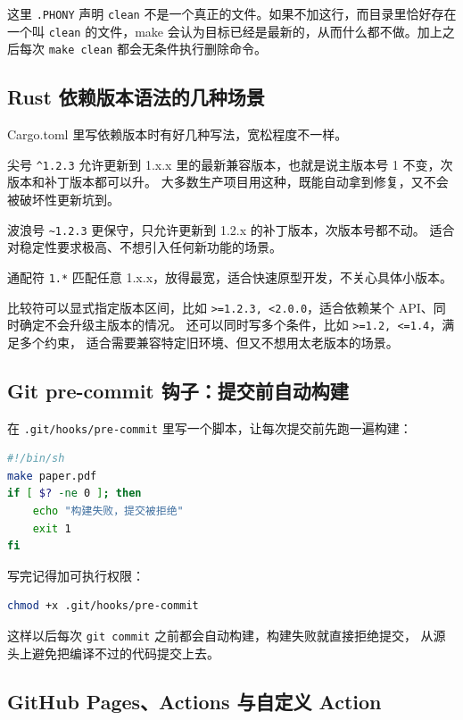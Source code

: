 \documentclass[a4paper,11pt]{ctexart}
\begin{document}
这里 \texttt{.PHONY} 声明 \texttt{clean} 不是一个真正的文件。如果不加这行，而目录里恰好存在一个叫
\texttt{clean} 的文件，make 会认为目标已经是最新的，从而什么都不做。加上之后每次 \texttt{make clean}
都会无条件执行删除命令。

\subsection{Rust 依赖版本语法的几种场景}

Cargo.toml 里写依赖版本时有好几种写法，宽松程度不一样。

尖号 \texttt{\^{}1.2.3} 允许更新到 1.x.x 里的最新兼容版本，也就是说主版本号 1 不变，次版本和补丁版本都可以升。
大多数生产项目用这种，既能自动拿到修复，又不会被破坏性更新坑到。

波浪号 \texttt{\~{}1.2.3} 更保守，只允许更新到 1.2.x 的补丁版本，次版本号都不动。
适合对稳定性要求极高、不想引入任何新功能的场景。

通配符 \texttt{1.*} 匹配任意 1.x.x，放得最宽，适合快速原型开发，不关心具体小版本。

比较符可以显式指定版本区间，比如 \texttt{>=1.2.3, <2.0.0}，适合依赖某个 API、同时确定不会升级主版本的情况。
还可以同时写多个条件，比如 \texttt{>=1.2, <=1.4}，满足多个约束，
适合需要兼容特定旧环境、但又不想用太老版本的场景。

\subsection{Git pre-commit 钩子：提交前自动构建}

在 \texttt{.git/hooks/pre-commit} 里写一个脚本，让每次提交前先跑一遍构建：

\begin{lstlisting}[language=bash,numbers=none]
#!/bin/sh
make paper.pdf
if [ $? -ne 0 ]; then
    echo "构建失败，提交被拒绝"
    exit 1
fi
\end{lstlisting}

写完记得加可执行权限：

\begin{lstlisting}[language=bash,numbers=none]
chmod +x .git/hooks/pre-commit
\end{lstlisting}

这样以后每次 \texttt{git commit} 之前都会自动构建，构建失败就直接拒绝提交，
从源头上避免把编译不过的代码提交上去。

\subsection{GitHub Pages、Actions 与自定义 Action}
\end{document}
